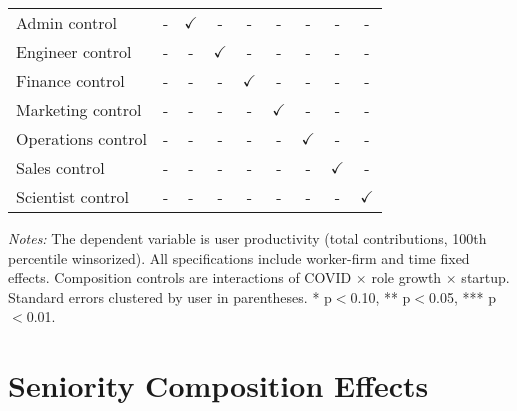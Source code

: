 \documentclass[11pt]{article}
\begin{document}
\begin{table}[H]
\begin{adjustbox}{width=\textwidth}
\begin{tabular}{l*{8}{c}}
\midrule
Admin control & - & $\checkmark$ & - & - & - & - & - & - \\
Engineer control & - & - & $\checkmark$ & - & - & - & - & - \\
Finance control & - & - & - & $\checkmark$ & - & - & - & - \\
Marketing control & - & - & - & - & $\checkmark$ & - & - & - \\
Operations control & - & - & - & - & - & $\checkmark$ & - & - \\
Sales control & - & - & - & - & - & - & $\checkmark$ & - \\
Scientist control & - & - & - & - & - & - & - & $\checkmark$ \\
\bottomrule
\end{tabular}
\end{adjustbox}
\begin{tablenotes}
\small
\item \textit{Notes:} The dependent variable is user productivity (total contributions, 100th percentile winsorized). 
All specifications include worker-firm and time fixed effects. 
Composition controls are interactions of COVID $\times$ role growth $\times$ startup.
Standard errors clustered by user in parentheses. 
* p$<$0.10, ** p$<$0.05, *** p$<$0.01.
\end{tablenotes}
\end{table}

\section{Seniority Composition Effects}
\end{document}
